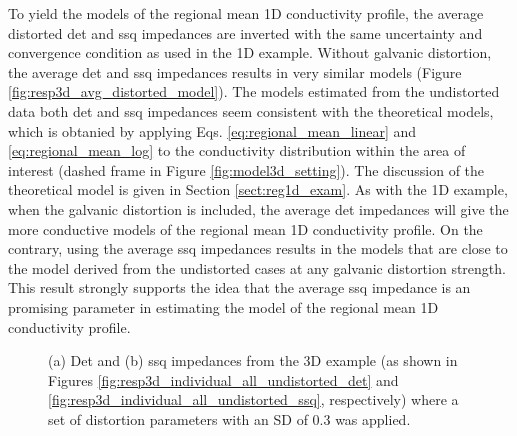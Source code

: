 
To yield the models of the regional mean 1D conductivity profile, the average distorted det and ssq impedances are inverted with the same uncertainty and convergence condition as used in the 1D example.
%
Without galvanic distortion, the average det and ssq impedances results in very similar models (Figure \ref{fig:resp3d_avg_distorted_model}).
The models estimated from the undistorted data both det and ssq impedances seem consistent with the theoretical models, which is obtanied by applying Eqs. \eqref{eq:regional_mean_linear} and \eqref{eq:regional_mean_log} to the conductivity distribution within the area of interest (dashed frame in Figure \ref{fig:model3d_setting}).
The discussion of the theoretical model is given in Section \ref{sect:reg1d_exam}.
%
As with the 1D example, when the galvanic distortion is included, the average det impedances will give the more conductive models of the regional mean 1D conductivity profile. On the contrary, using the average ssq impedances results in the models that are close to the model derived from the undistorted cases at any galvanic distortion strength.
This result strongly supports the idea that the average ssq impedance is an promising parameter in estimating the model of the regional mean 1D conductivity profile.










\begin{figure}[t]
	\centering
	\caption[Example of distorted det and ssq impedances from distorted 3D MTdataset]{(a) Det and (b) ssq impedances from the 3D example (as shown in Figures \ref{fig:resp3d_individual_all_undistorted_det} and \ref{fig:resp3d_individual_all_undistorted_ssq}, respectively) where a set of distortion parameters with an SD of 0.3 was applied.}
	\label{fig:resp3d_individual_all_distorted_sd3a}
\end{figure}

